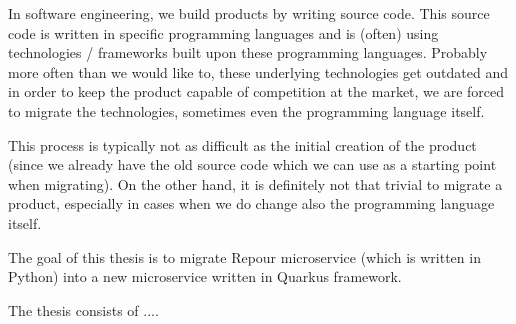 \documentclass[../../main.tex]{subfiles}
\begin{document}
In software engineering, we build products by writing source code. This source code is written in specific programming languages and is (often) using technologies / frameworks built upon these programming languages. Probably more often than we would like to, these underlying technologies get outdated and in order to keep the product capable of competition at the market, we are forced to migrate the technologies, sometimes even the programming language itself.

This process is typically not as difficult as the initial creation of the product (since we already have the old source code which we can use as a starting point when migrating). On the other hand, it is definitely not that trivial to migrate a product, especially in cases when we do change also the programming language itself.

The goal of this thesis is to migrate Repour microservice (which is written in Python) into a new microservice written in Quarkus framework.

The thesis consists of .... %
\end{document}
